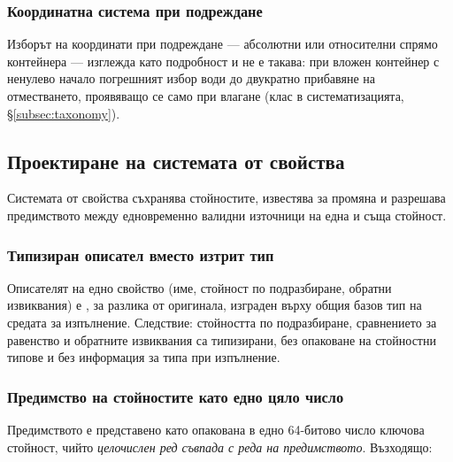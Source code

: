 \subsubsection{Координатна система при подреждане}

Изборът на координати при подреждане --- абсолютни или относителни спрямо контейнера ---
изглежда като подробност и не е такава: при вложен контейнер с ненулево начало погрешният
избор води до двукратно прибавяне на отместването, проявяващо се само при влагане (клас в
систематизацията, §\ref{subsec:taxonomy}).

\subsection{Проектиране на системата от свойства}
\label{subsec:binding_design}

Системата от свойства съхранява стойностите, известява за промяна и разрешава
предимството между едновременно валидни източници на една и съща стойност.

\subsubsection{Типизиран описател вместо изтрит тип}

Описателят на едно свойство (име, стойност по подразбиране, обратни извиквания) е
, за разлика от оригинала, изграден върху общия базов
тип на средата за изпълнение. Следствие: стойността по подразбиране, сравнението за
равенство и обратните извиквания са типизирани, без опаковане на стойностни типове и без
информация за типа при изпълнение.

\subsubsection{Предимство на стойностите като едно цяло число}

Предимството е представено като опакована в едно 64-битово число ключова стойност, чийто
\emph{целочислен ред съвпада с реда на предимството}. Възходящо:

